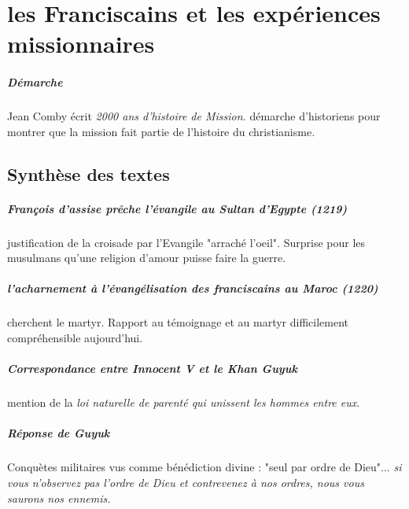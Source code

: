 \chapter{les Franciscains et les expériences missionnaires}


\paragraph{Démarche} Jean Comby écrit \textit{2000 ans d'histoire de Mission. }démarche d'historiens pour montrer que la mission fait partie de l'histoire du christianisme. 


\section{Synthèse des textes}
\paragraph{François d'assise prêche l'évangile au Sultan d'Egypte (1219)} justification de la croisade par l'Evangile "arraché l'oeil". Surprise pour les musulmans qu'une religion d'amour puisse faire la guerre.

\paragraph{l'acharnement à l'évangélisation des franciscains au Maroc (1220)} cherchent le martyr. Rapport au témoignage et au martyr difficilement compréhensible aujourd'hui.

\paragraph{Correspondance entre Innocent V et le Khan Guyuk}  mention de la \textit{loi naturelle de parenté qui unissent les hommes entre eux}. 

\paragraph{Réponse de Guyuk} Conquètes militaires vus comme bénédiction divine : "seul par ordre de Dieu"... \textit{si vous n'observez pas l'ordre de Dieu et contrevenez à nos ordres, nous vous saurons nos ennemis.}

